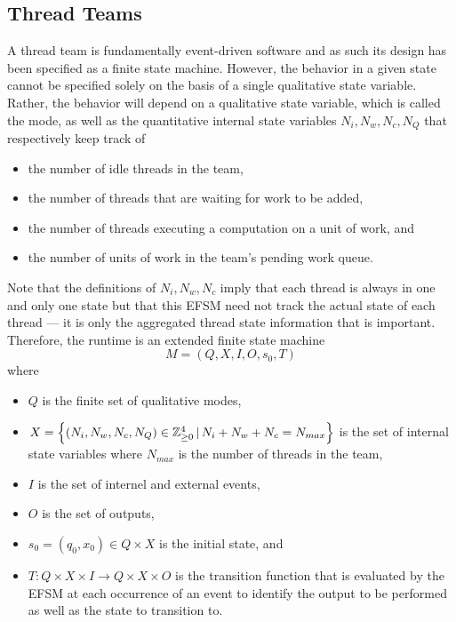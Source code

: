 \documentclass{article}
\newcommand{\Z}                 {{\mathbb Z}}
\begin{document}
\subsection{Thread Teams}
A thread team is fundamentally event-driven software and as such its design
has been specified as a finite state machine.  However, the behavior in a given
state cannot be specified solely on the basis of a single qualitative state
variable.  Rather, the behavior will depend on a qualitative state variable,
which is called the mode, as well as the quantitative internal state variables
$N_i, N_w, N_c, N_Q$ that respectively keep track of 
\begin{itemize}
\item{the number of idle threads in the team,}
\item{the number of threads that are waiting for work to be added,}
\item{the number of threads executing a computation on a unit of work, and}
\item{the number of units of work in the team's pending work queue.}
\end{itemize}
Note that the definitions of $N_i, N_w, N_c$ imply that each thread is
always in one and only one state but that this EFSM need not track the actual
state of each thread --- it is only the aggregated thread state information that
is important.  Therefore, the runtime is an extended finite state machine 
\[
M = (Q, X, I, O, s_0, T)
\]
where
\begin{itemize}
\item{$Q$ is the finite set of qualitative modes,}
\item{$X = \set{(N_i, N_w, N_c, N_Q) \in \Z_{\ge 0}^4\,|\,N_i + N_w + N_c =
N_{max}}$ is the set of internal state variables where $N_{max}$ is the
number of threads in the team,}
\item{$I$ is the set of internel and external events,}
\item{$O$ is the set of outputs,}
\item{$s_0 = (q_0, x_0) \in Q \times X$ is the initial state, and}
\item{$T : Q \times X \times I \to Q \times X \times O$ is the transition
function that is evaluated by the EFSM at each occurrence of an event to
identify the output to be performed as well as the state to transition to.}
\end{itemize}
\end{document}
